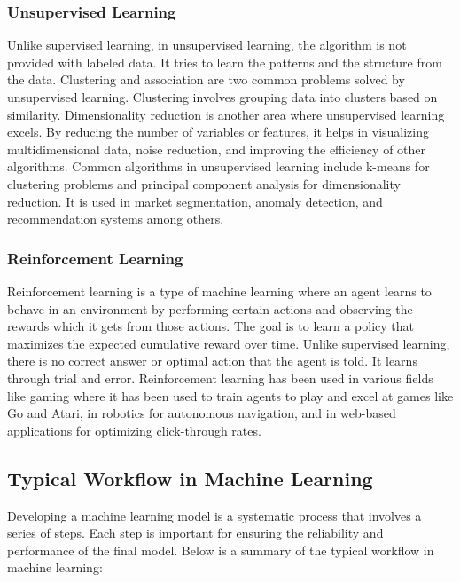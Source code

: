 \subsubsection{Unsupervised Learning}
Unlike supervised learning, in unsupervised learning, the algorithm is not provided with labeled data. It tries to learn the patterns and the structure from the data. Clustering and association are two common problems solved by unsupervised learning. Clustering involves grouping data into clusters based on similarity. Dimensionality reduction is another area where unsupervised learning excels. By reducing the number of variables or features, it helps in visualizing multidimensional data, noise reduction, and improving the efficiency of other algorithms. Common algorithms in unsupervised learning include k-means for clustering problems and principal component analysis for dimensionality reduction. It is used in market segmentation, anomaly detection, and recommendation systems among others.

\subsubsection{Reinforcement Learning}
Reinforcement learning is a type of machine learning where an agent learns to behave in an environment by performing certain actions and observing the rewards which it gets from those actions. The goal is to learn a policy that maximizes the expected cumulative reward over time. Unlike supervised learning, there is no correct answer or optimal action that the agent is told. It learns through trial and error. Reinforcement learning has been used in various fields like gaming where it has been used to train agents to play and excel at games like Go and Atari, in robotics for autonomous navigation, and in web-based applications for optimizing click-through rates.

\subsection{Typical Workflow in Machine Learning}
Developing a machine learning model is a systematic process that involves a series of steps. Each step is important for ensuring the reliability and performance of the final model. Below is a summary of the typical workflow in machine learning:

